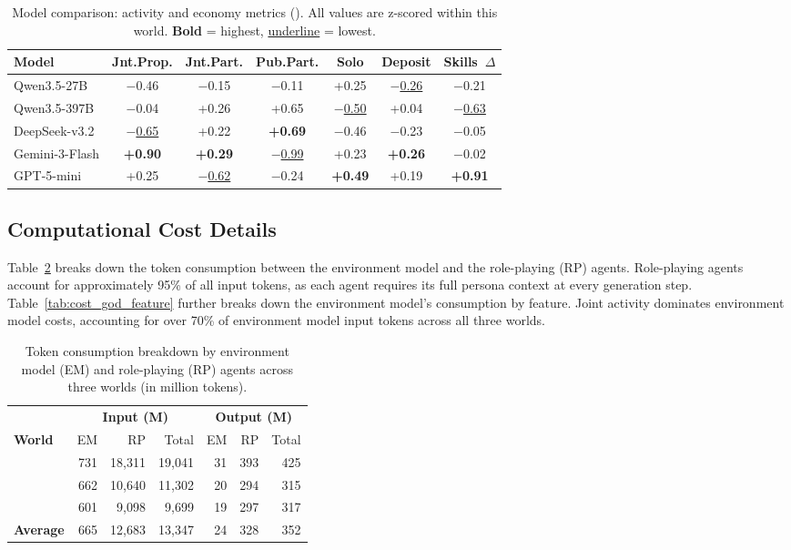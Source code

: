 \begin{table}[t]
\centering
\caption{Model comparison: activity and economy metrics (\academy{}).
All values are z-scored within this world.
\textbf{Bold} = highest, \underline{underline} = lowest.}
\label{tab:model_academy_activity}
\begin{tabular}{l c c c c c c}
\toprule
\textbf{Model} & Jnt.Prop. & Jnt.Part. & Pub.Part. & Solo & Deposit & Skills~$\Delta$ \\
\midrule
Qwen3.5-27B      & $-$0.46 & $-$0.15 & $-$0.11 & +0.25 & \underline{$-$0.26} & $-$0.21 \\
Qwen3.5-397B     & $-$0.04 & +0.26 & +0.65 & \underline{$-$0.50} & +0.04 & \underline{$-$0.63} \\
DeepSeek-v3.2    & \underline{$-$0.65} & +0.22 & \textbf{+0.69} & $-$0.46 & $-$0.23 & $-$0.05 \\
Gemini-3-Flash   & \textbf{+0.90} & \textbf{+0.29} & \underline{$-$0.99} & +0.23 & \textbf{+0.26} & $-$0.02 \\
GPT-5-mini       & +0.25 & \underline{$-$0.62} & $-$0.24 & \textbf{+0.49} & +0.19 & \textbf{+0.91} \\
\bottomrule
\end{tabular}
\end{table}


\subsection{Computational Cost Details}
\label{sec:appendix_cost}

Table~\ref{tab:cost_god_rp} breaks down the token consumption
between the environment model and the role-playing (RP) agents.
Role-playing agents account for approximately 95\% of all input tokens,
as each agent requires its full persona context at every generation step.
Table~\ref{tab:cost_god_feature} further breaks down the environment model's consumption by feature.
Joint activity dominates environment model costs,
accounting for over 70\% of environment model input tokens across all three worlds.

\begin{table}[h]
\centering
\caption{Token consumption breakdown by environment model (EM) and role-playing (RP) agents
across three worlds (in million tokens).}
\label{tab:cost_god_rp}
\small
\begin{tabular}{l rrr rrr}
\toprule
& \multicolumn{3}{c}{\textbf{Input (M)}} & \multicolumn{3}{c}{\textbf{Output (M)}} \\
\cmidrule(lr){2-4} \cmidrule(lr){5-7}
\textbf{World} & EM & RP & Total & EM & RP & Total \\
\midrule
\campus{}       & 731 & 18,311 & 19,041 & 31 & 393 & 425 \\
\academy{}      & 662 & 10,640 & 11,302 & 20 & 294 & 315 \\
\apartment{}    & 601 &  9,098 &  9,699 & 19 & 297 & 317 \\
\midrule
\textbf{Average} & 665 & 12,683 & 13,347 & 24 & 328 & 352 \\
\bottomrule
\end{tabular}
\end{table}

